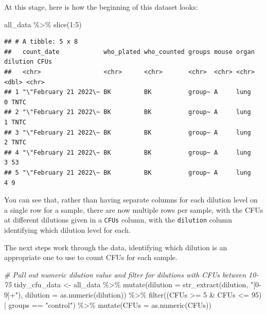 \documentclass[
]{book}
\newenvironment{Shaded}{\begin{snugshade}}{\end{snugshade}}
\newcommand{\AttributeTok}[1]{\textcolor[rgb]{0.77,0.63,0.00}{#1}}
\newcommand{\CommentTok}[1]{\textcolor[rgb]{0.56,0.35,0.01}{\textit{#1}}}
\newcommand{\DecValTok}[1]{\textcolor[rgb]{0.00,0.00,0.81}{#1}}
\newcommand{\FunctionTok}[1]{\textcolor[rgb]{0.00,0.00,0.00}{#1}}
\newcommand{\NormalTok}[1]{#1}
\newcommand{\OtherTok}[1]{\textcolor[rgb]{0.56,0.35,0.01}{#1}}
\newcommand{\SpecialCharTok}[1]{\textcolor[rgb]{0.00,0.00,0.00}{#1}}
\newcommand{\StringTok}[1]{\textcolor[rgb]{0.31,0.60,0.02}{#1}}
\begin{document}
At this stage, here is how the beginning of this dataset looks:

\begin{Shaded}
\begin{Highlighting}[]
\NormalTok{all\_data }\SpecialCharTok{\%\textgreater{}\%} 
  \FunctionTok{slice}\NormalTok{(}\DecValTok{1}\SpecialCharTok{:}\DecValTok{5}\NormalTok{)}
\end{Highlighting}
\end{Shaded}

\begin{verbatim}
## # A tibble: 5 x 8
##   count_date            who_plated who_counted groups mouse organ dilution CFUs 
##   <chr>                 <chr>      <chr>       <chr>  <chr> <chr>    <dbl> <chr>
## 1 "\"February 21 2022\~ BK         BK          group~ A     lung         0 TNTC 
## 2 "\"February 21 2022\~ BK         BK          group~ A     lung         1 TNTC 
## 3 "\"February 21 2022\~ BK         BK          group~ A     lung         2 TNTC 
## 4 "\"February 21 2022\~ BK         BK          group~ A     lung         3 53   
## 5 "\"February 21 2022\~ BK         BK          group~ A     lung         4 9
\end{verbatim}

You can see that, rather than having separate columns for each dilution level
on a single row for a sample, there are now multiple rows per sample, with the
CFUs at different dilutions given in a \texttt{CFUs} column, with the \texttt{dilution} column
identifying which dilution level for each.

The next steps work through the data, identifying which dilution is an
appropriate one to use to count CFUs for each sample.

\begin{Shaded}
\begin{Highlighting}[]
\CommentTok{\# Pull out numeric dilution value and filter for dilutions with CFUs between 10{-}75}
\NormalTok{tidy\_cfu\_data }\OtherTok{\textless{}{-}}\NormalTok{ all\_data }\SpecialCharTok{\%\textgreater{}\%}
  \FunctionTok{mutate}\NormalTok{(}\AttributeTok{dilution =} \FunctionTok{str\_extract}\NormalTok{(dilution, }\StringTok{"[0{-}9]+"}\NormalTok{),}
         \AttributeTok{dilution =} \FunctionTok{as.numeric}\NormalTok{(dilution)) }\SpecialCharTok{\%\textgreater{}\%}
  \FunctionTok{filter}\NormalTok{((CFUs }\SpecialCharTok{\textgreater{}=} \DecValTok{5} \SpecialCharTok{\&}\NormalTok{ CFUs }\SpecialCharTok{\textless{}=} \DecValTok{95}\NormalTok{) }\SpecialCharTok{|}\NormalTok{ groups }\SpecialCharTok{==} \StringTok{"control"}\NormalTok{) }\SpecialCharTok{\%\textgreater{}\%}
  \FunctionTok{mutate}\NormalTok{(}\AttributeTok{CFUs =} \FunctionTok{as.numeric}\NormalTok{(CFUs)) }
\end{Highlighting}
\end{Shaded}
\end{document}
